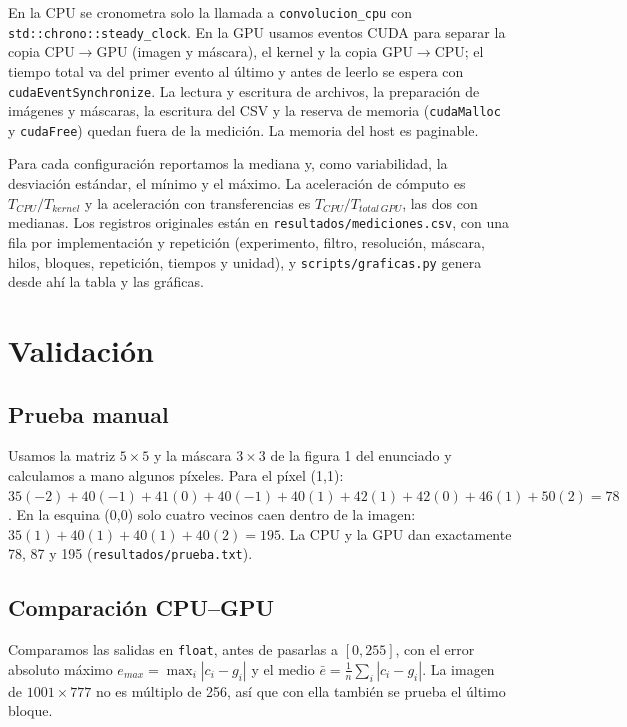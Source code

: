 \documentclass[12pt]{article}
\begin{document}
En la CPU se cronometra solo la llamada a \texttt{convolucion\_cpu} con
\texttt{std::chrono::steady\_clock}. En la GPU usamos eventos CUDA para separar la copia
CPU$\to$GPU (imagen y máscara), el kernel y la copia GPU$\to$CPU; el tiempo total va del primer
evento al último y antes de leerlo se espera con \texttt{cudaEventSynchronize}. La lectura y
escritura de archivos, la preparación de imágenes y máscaras, la escritura del CSV y la reserva
de memoria (\texttt{cudaMalloc} y \texttt{cudaFree}) quedan fuera de la medición. La memoria
del host es paginable.

Para cada configuración reportamos la mediana y, como variabilidad, la desviación estándar, el
mínimo y el máximo. La aceleración de cómputo es $T_{CPU}/T_{kernel}$ y la aceleración con
transferencias es $T_{CPU}/T_{total\,GPU}$, las dos con medianas. Los registros originales están
en \texttt{resultados/mediciones.csv}, con una fila por implementación y repetición
(experimento, filtro, resolución, máscara, hilos, bloques, repetición, tiempos y unidad), y
\texttt{scripts/graficas.py} genera desde ahí la tabla y las gráficas.

\section{Validación}

\subsection{Prueba manual}
Usamos la matriz $5\times5$ y la máscara $3\times3$ de la figura 1 del enunciado y calculamos a
mano algunos píxeles. Para el píxel (1,1):
$35(-2)+40(-1)+41(0)+40(-1)+40(1)+42(1)+42(0)+46(1)+50(2)=78$. En la esquina (0,0) solo cuatro
vecinos caen dentro de la imagen: $35(1)+40(1)+40(1)+40(2)=195$. La CPU y la GPU dan
exactamente 78, 87 y 195 (\texttt{resultados/prueba.txt}).

\subsection{Comparación CPU--GPU}
Comparamos las salidas en \texttt{float}, antes de pasarlas a $[0,255]$, con el error absoluto
máximo $e_{max}=\max_i |c_i-g_i|$ y el medio $\bar e = \frac1n\sum_i |c_i-g_i|$. La imagen de
$1001\times777$ no es múltiplo de 256, así que con ella también se prueba el último bloque.
\end{document}
